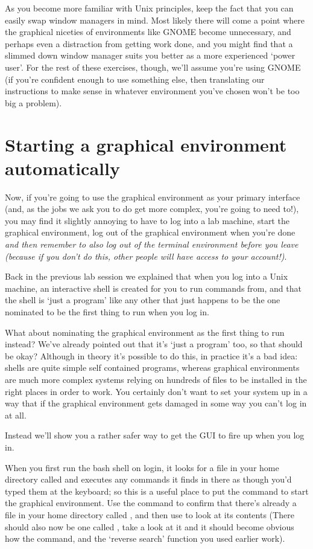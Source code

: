 
As you become more familiar with Unix principles, keep the fact that you can easily swap window managers in mind. Most likely there will come a point where the graphical niceties of environments like GNOME become unnecessary, and perhaps even a distraction from getting work done, and you might find that a slimmed down window manager suits you better as a more experienced `power user'. For the rest of these exercises, though, we'll assume you're using GNOME (if you're confident enough to use something else, then translating our instructions to make sense in whatever environment you've chosen won't be too big a problem).


\section{Starting a graphical environment automatically}

Now, if you're going to use the graphical environment as your primary interface (and, as the jobs we ask you to do get more complex, you're going to need to!), you may find it slightly annoying to have to log into a lab machine, start the graphical environment, log out of the graphical environment when you're done \textit{and then remember to also log out of the terminal environment before you leave (because if you don't do this, other people will have access to your account!)}.

Back in the previous lab session we explained that when you log into a Unix machine, an interactive shell is created for you to run commands from, and that the shell is `just a program' like any other that just happens to be the one nominated to be the first thing to run when you log in.

What about nominating the graphical environment as the first thing to run instead? We've already pointed out that it's `just a program' too, so that should be okay? Although in theory it's possible to do this, in practice it's a bad idea: shells are quite simple self contained programs, whereas graphical environments are much more complex systems relying on hundreds of files to be installed in the right places in order to work. You certainly don't want to set your system up in a way that if the graphical environment gets damaged in some way you can't log in at all.

Instead we'll show you a rather safer way to get the GUI to fire up when you log in.

When you first run the bash shell on login, it looks for a file in your home directory called  and executes any commands it finds in there as though you'd typed them at the keyboard; so this is a useful place to put the command to start the graphical environment. Use the  command to confirm that there's already a file in your home directory called , and then use  to look at its contents (There should also now be one called , take a look at it and it should become obvious how the  command, and the `reverse search' function you used earlier work).

